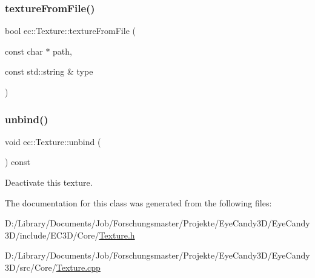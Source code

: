 \subsubsection{\texorpdfstring{texture\+From\+File()}{textureFromFile()}}
{\footnotesize\ttfamily bool ec\+::\+Texture\+::texture\+From\+File (\begin{DoxyParamCaption}\item[{const char $\ast$}]{path,  }\item[{const std\+::string \&}]{type }\end{DoxyParamCaption})}

\mbox{\label{classec_1_1_texture_a95c72abc5c801df231fc970c6adffdcc}} 
\subsubsection{\texorpdfstring{unbind()}{unbind()}}
{\footnotesize\ttfamily void ec\+::\+Texture\+::unbind (\begin{DoxyParamCaption}{ }\end{DoxyParamCaption}) const}

Deactivate this texture. 

The documentation for this class was generated from the following files\+:\begin{DoxyCompactItemize}
\item 
D\+:/\+Library/\+Documents/\+Job/\+Forschungsmaster/\+Projekte/\+Eye\+Candy3\+D/\+Eye\+Candy3\+D/include/\+E\+C3\+D/\+Core/\mbox{\hyperlink{_texture_8h}{Texture.\+h}}\item 
D\+:/\+Library/\+Documents/\+Job/\+Forschungsmaster/\+Projekte/\+Eye\+Candy3\+D/\+Eye\+Candy3\+D/src/\+Core/\mbox{\hyperlink{_texture_8cpp}{Texture.\+cpp}}\end{DoxyCompactItemize}
